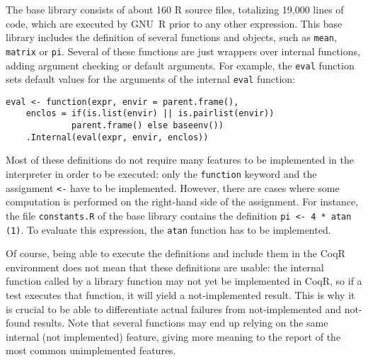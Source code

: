 \documentclass[
    sigplan,
    10pt,
    review, %
    natbib=false %
 ]{acmart}
\newcommand\et[1]{\todo[color=blue!20,size=\scriptsize]{#1}}
\newcommand\CoqR{CoqR}
\begin{document}
The base library consists of about 160 R source files, totalizing 19,000 lines of code, which are executed by GNU~R prior to any other
expression. This base library includes the definition of several
functions and objects, such as \texttt{mean}, \texttt{matrix} or \texttt{pi}.
Several of these functions are just wrappers over internal functions, adding  argument checking or default arguments.
For example, the \texttt{eval} function sets default values for the arguments of the internal \texttt{eval} function:
\begin{verbatim}
eval <- function(expr, envir = parent.frame(),
    enclos = if(is.list(envir) || is.pairlist(envir))
             parent.frame() else baseenv())
    .Internal(eval(expr, envir, enclos))
\end{verbatim}

Most of these definitions do not require many features to be implemented in the interpreter in order to be executed: only
the \texttt{function} keyword and the assignment \texttt{<-} have
to be implemented.
However, there are cases where some computation
is performed on the right-hand side of the assignment.
For instance, the file \texttt{constants.R}
of the base library contains the definition \texttt{pi <- 4 * atan (1)}.
To evaluate this expression, the \texttt{atan} function has to be implemented.


Of course, being able to execute the definitions and include
them in the \CoqR{} environment does not mean that these definitions are usable: the internal function called by a library function may not yet be implemented in \CoqR, so if a test executes that function, it will yield a not-implemented result. This is why it is crucial to be able to differentiate actual failures from not-implemented and not-found results. Note that several functions may end up relying on the same internal (not implemented) feature, giving more meaning to the report of the most common unimplemented features.
\end{document}
